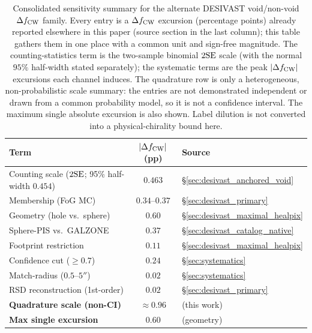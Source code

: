 \documentclass[twocolumn,linenumbers]{aastex702}
\begin{document}
\begin{table}[ht]
\caption{Consolidated sensitivity summary for the alternate DESIVAST
void/non-void $\Delta f_{\rm CW}$ family. Every entry is a
$\Delta f_{\rm CW}$ excursion (percentage points) already reported
elsewhere in this paper (source section in the last column); this table
gathers them in one place with a common unit and sign-free magnitude.
The counting-statistics term is the two-sample binomial $2{\rm SE}$
scale (with the normal $95\%$ half-width stated separately); the systematic terms are the peak $|\Delta f_{\rm CW}|$
excursions each channel induces. The quadrature row is only a
heterogeneous, non-probabilistic scale summary: the entries are not
demonstrated independent or drawn from a common probability model, so it
is not a confidence interval. The maximum single absolute excursion is
also shown. Label dilution is not converted into a physical-chirality
bound here.}
\label{tab:systematic_budget}
{\small
\begin{ruledtabular}
\begin{tabular}{lcl}
Term & $|\Delta f_{\rm CW}|$ (pp) & Source \\
\hline
Counting scale ($2{\rm SE}$; 95\% half-width $0.454$) & $0.463$ & \S\ref{sec:desivast_anchored_void} \\
Membership (FoG MC)              & $0.34$--$0.37$ & \S\ref{sec:desivast_primary} \\
Geometry (hole vs.\ sphere)      & $0.60$ & \S\ref{sec:desivast_maximal_healpix} \\
Sphere-PIS vs.\ GALZONE          & $0.37$ & \S\ref{sec:desivast_catalog_native} \\
Footprint restriction            & $0.11$ & \S\ref{sec:desivast_maximal_healpix} \\
Confidence cut ($\ge 0.7$)       & $0.24$ & \S\ref{sec:systematics} \\
Match-radius ($0.5$--$5''$)      & $0.02$ & \S\ref{sec:systematics} \\
RSD reconstruction (1st-order)   & $0.02$ & \S\ref{sec:desivast_primary} \\
\hline
\textbf{Quadrature scale (non-CI)} & $\approx 0.96$ & (this work) \\
\textbf{Max single excursion}    & $0.60$ & (geometry) \\
\end{tabular}
\end{ruledtabular}
}
\end{table}
\fi
\end{document}
